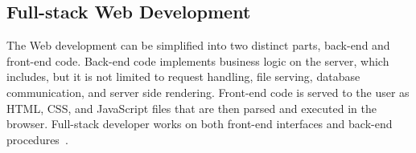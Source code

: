 \subsection*{Full-stack Web Development}
The Web development can be simplified into two distinct parts, back-end and front-end code.
Back-end code implements business logic on the server, which includes, but it is not limited to request handling,
file serving, database communication, and server side rendering.
Front-end code is served to the user as HTML, CSS, and JavaScript files that are then parsed and executed in the browser.
Full-stack developer works on both front-end interfaces and back-end procedures~\parencite[Full-stack Web Developer]{w3schools_fullstack}.